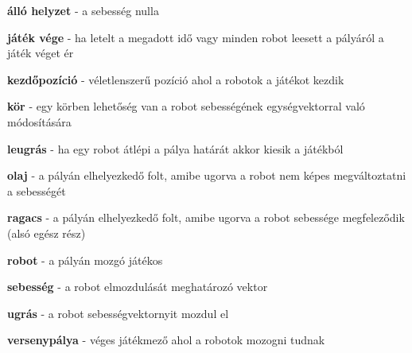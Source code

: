 \textbf{álló helyzet} - a sebesség nulla

\textbf{játék vége} - ha letelt a megadott idő vagy minden robot leesett a pályáról a játék véget ér

\textbf{kezdőpozíció} - véletlenszerű pozíció ahol a robotok a játékot kezdik

\textbf{kör} - egy körben lehetőség van a robot sebességének egységvektorral való módosítására

\textbf{leugrás} - ha egy robot átlépi a pálya határát akkor kiesik a játékból

\textbf{olaj} - a pályán elhelyezkedő folt, amibe ugorva a robot nem képes megváltoztatni a sebességét

\textbf{ragacs} - a pályán elhelyezkedő folt, amibe ugorva a robot sebessége megfeleződik (alsó egész rész)

\textbf{robot} - a pályán mozgó játékos

\textbf{sebesség} - a robot elmozdulását meghatározó vektor

\textbf{ugrás} - a robot sebességvektornyit mozdul el

\textbf{versenypálya} - véges játékmező ahol a robotok mozogni tudnak
